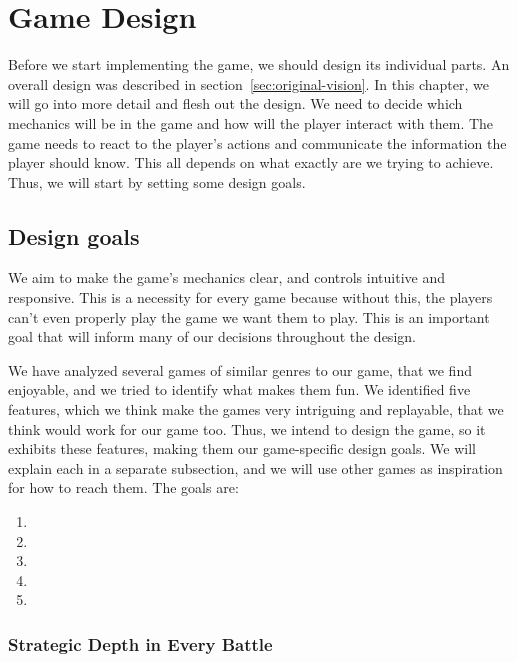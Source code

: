 \chapter{Game Design}

Before we start implementing the game, we should design its individual parts.
An overall design was described in section~\ref{sec:original-vision}.
In this chapter, we will go into more detail and flesh out the design.
We need to decide which mechanics will be in the game and how will the player interact with them.
The game needs to react to the player's actions and communicate the information the player should know.
This all depends on what exactly are we trying to achieve.
Thus, we will start by setting some design goals.

\section{Design goals}

We aim to make the game's mechanics clear, and controls intuitive and responsive.
This is a necessity for every game because without this, the players can't even properly play the game we want them to play.
This is an important goal that will inform many of our decisions throughout the design.

We have analyzed several games of similar genres to our game, that we find enjoyable, and we tried to identify what makes them fun.
We identified five features, which we think make the games very intriguing and replayable, that we think would work for our game too.
Thus, we intend to design the game, so it exhibits these features, making them our game-specific design goals.
We will explain each in a separate subsection, and we will use other games as inspiration for how to reach them.
The goals are:
\begin{enumerate}
    \item {}
    \item {}
    \item {}
    \item {}
    \item {}
\end{enumerate}

\subsection{Strategic Depth in Every Battle} \label{sec:goal-depth-battle}

